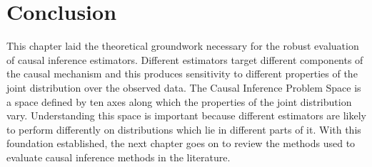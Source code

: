 \documentclass[../main.tex]{subfiles}
\begin{document}
\section{Conclusion}

This chapter laid the theoretical groundwork necessary for the robust evaluation of causal inference estimators. Different estimators target different components of the causal mechanism and this produces sensitivity to different properties of the joint distribution over the observed data. The Causal Inference Problem Space is a space defined by ten axes along which the properties of the joint distribution vary. Understanding this space is important because different estimators are likely to perform differently on distributions which lie in different parts of it. With this foundation established, the next chapter goes on to review the methods used to evaluate causal inference methods in the literature.
\end{document}
